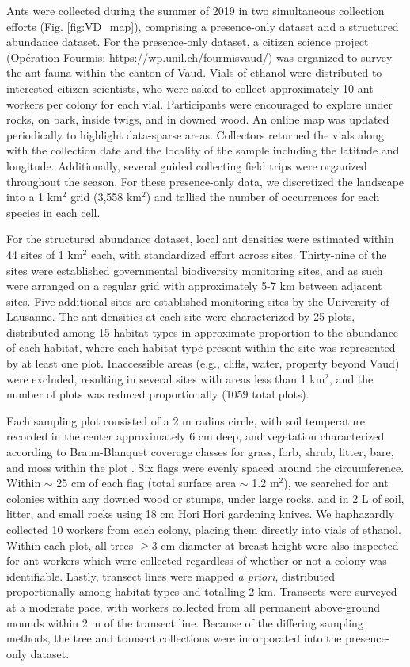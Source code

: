\documentclass[preprint,final,times,12pt,3p]{elsarticle}
\begin{document}
Ants were collected during the summer of 2019 in two simultaneous collection efforts (Fig. \ref{fig:VD_map}), comprising a presence-only dataset and a structured abundance dataset. For the presence-only dataset, a citizen science project (Opération Fourmis: https://wp.unil.ch/fourmisvaud/) was organized to survey the ant fauna within the canton of Vaud. Vials of ethanol were distributed to interested citizen scientists, who were asked to collect approximately 10 ant workers per colony for each vial. Participants were encouraged to explore under rocks, on bark, inside twigs, and in downed wood. An online map was updated periodically to highlight data-sparse areas. Collectors returned the vials along with the collection date and the locality of the sample including the latitude and longitude. Additionally, several guided collecting field trips were organized throughout the season. For these presence-only data, we discretized the landscape into a 1 km$^2$ grid (3,558 km$^2$) and tallied the number of occurrences for each species in each cell. 

For the structured abundance dataset, local ant densities were estimated within 44 sites of 1 km$^2$ each, with standardized effort across sites. Thirty-nine of the sites were established governmental biodiversity monitoring sites, and as such were arranged on a regular grid with approximately 5-7 km between adjacent sites. Five additional sites are established monitoring sites by the University of Lausanne. The ant densities at each site were characterized by 25 plots, distributed among 15 habitat types \citep{Gago-Silva2017} in approximate proportion to the abundance of each habitat, where each habitat type present within the site was represented by at least one plot. Inaccessible areas (e.g., cliffs, water, property beyond Vaud) were excluded, resulting in several sites with areas less than 1 km$^2$, and the number of plots was reduced proportionally (1059 total plots). 

Each sampling plot consisted of a 2 m radius circle, with soil temperature recorded in the center approximately 6 cm deep, and vegetation characterized according to Braun-Blanquet coverage classes for grass, forb, shrub, litter, bare, and moss within the plot \citep{Douglas1978}. Six flags were evenly spaced around the circumference. Within $\sim$ 25 cm of each flag (total surface area $\sim$ 1.2 m$^2$), we searched for ant colonies within any downed wood or stumps, under large rocks, and in 2 L of soil, litter, and small rocks using 18 cm Hori Hori gardening knives. We haphazardly collected 10 workers from each colony, placing them directly into vials of ethanol. Within each plot, all trees $\geq$3 cm diameter at breast height were also inspected for ant workers which were collected regardless of whether or not a colony was identifiable. Lastly, transect lines were mapped \emph{a priori}, distributed proportionally among habitat types and totalling 2 km. Transects were surveyed at a moderate pace, with workers collected from all permanent above-ground mounds within 2 m of the transect line. Because of the differing sampling methods, the tree and transect collections were incorporated into the presence-only dataset. 
\end{document}
